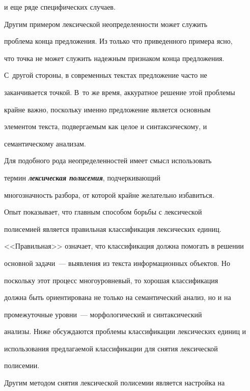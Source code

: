   и еще ряде специфических случаев. 


   


   Другим примером лексической неопределенности может служить 


проблема конца предложения. Из только что приведенного примера ясно, 


что точка не может служить надежным признаком конца предложения. 


С~другой стороны, в современных текстах предложение часто не 


заканчивается точкой. В~то же время, аккуратное решение этой проблемы 


крайне важно, поскольку именно предложение является основным 


элементом текста, подвергаемым как целое и синтаксическому, и 


семантическому анализам.


   


   Для подобного рода неопределенностей имеет смысл использовать 


термин {\bfseries\textit{лексическая полисемия}}, подчеркивающий 


многозначность разбора, от которой крайне желательно избавиться. 


   


   Опыт показывает, что главным способом борьбы с лексической 


полисемией является правильная классификация лексических единиц. 


<<Правильная>> означает, что  классификация должна помогать в решении 


основной задачи~--- выявления из текста информационных объектов. Но 


поскольку этот процесс многоуровневый, то хорошая классификация 


должна быть ориентирована не только на семантический анализ, но и на 


промежуточные уровни~--- морфологический и синтаксический 


анализы. Ниже обсуждаются проблемы классификации лексических единиц и 


использования предлагаемой классификации для снятия лексической 


полисемии.


   


   Другим методом снятия лексической полисемии является настройка на 


